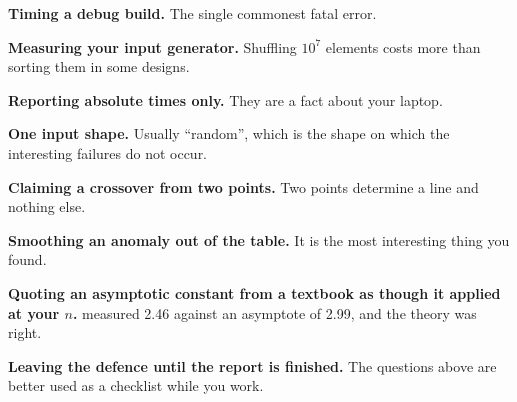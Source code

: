\begin{pitfall}
\begin{tight}
  \item \textbf{Timing a debug build.} The single commonest fatal error.
  \item \textbf{Measuring your input generator.} Shuffling $10^{7}$ elements
        costs more than sorting them in some designs.
  \item \textbf{Reporting absolute times only.} They are a fact about your
        laptop.
  \item \textbf{One input shape.} Usually ``random'', which is the shape on
        which the interesting failures do not occur.
  \item \textbf{Claiming a crossover from two points.} Two points determine a
        line and nothing else.
  \item \textbf{Smoothing an anomaly out of the table.} It is the most
        interesting thing you found.
  \item \textbf{Quoting an asymptotic constant from a textbook as though it
        applied at your $n$.}  measured 2.46 against an
        asymptote of 2.99, and the theory was right.
  \item \textbf{Leaving the defence until the report is finished.} The
        questions above are better used as a checklist while you work.
\end{tight}
\end{pitfall}

